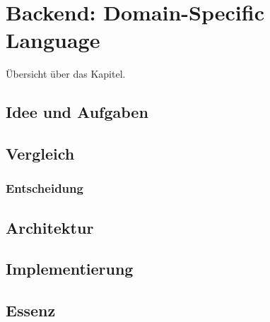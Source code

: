 \chapter{Backend: Domain-Specific Language}

Übersicht über das Kapitel.

\section{Idee und Aufgaben}

\section{Vergleich}

\subsection{Entscheidung}

\section{Architektur}

\section{Implementierung}

\section{Essenz}

